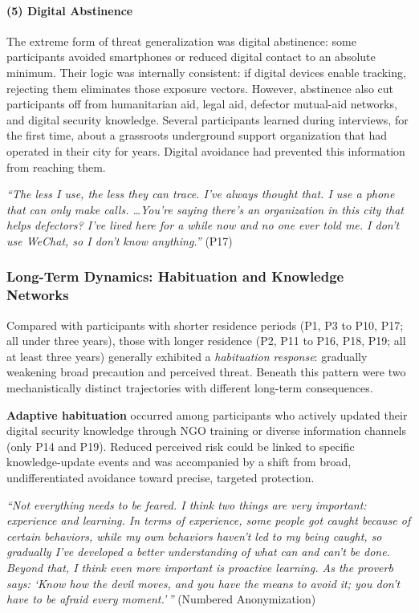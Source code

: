 \documentclass[conference,compsoc]{IEEEtran}
\begin{document}
\paragraph{\textbf{(5) Digital Abstinence}}
The extreme form of threat generalization was digital abstinence: some participants avoided smartphones or reduced digital contact to an absolute minimum. Their logic was internally consistent: if digital devices enable tracking, rejecting them eliminates those exposure vectors. However, abstinence also cut participants off from humanitarian aid, legal aid, defector mutual-aid networks, and digital security knowledge. Several participants learned during interviews, for the first time, about a grassroots underground support organization that had operated in their city for years. Digital avoidance had prevented this information from reaching them.

\begin{displayquote}
\textit{``The less I use, the less they can trace. I've always thought that. I use a phone that can only make calls. \ldots You're saying there's an organization in this city that helps defectors? I've lived here for a while now and no one ever told me. I don't use WeChat, so I don't know anything.''} (P17)
\end{displayquote}

\subsubsection{Long-Term Dynamics: Habituation and Knowledge Networks}
\label{subsubsec:longitudinal}

Compared with participants with shorter residence periods (P1, P3 to P10, P17; all under three years), those with longer residence (P2, P11 to P16, P18, P19; all at least three years) generally exhibited a \emph{habituation response}: gradually weakening broad precaution and perceived threat. Beneath this pattern were two mechanistically distinct trajectories with different long-term consequences.

\textbf{Adaptive habituation} occurred among participants who actively updated their digital security knowledge through NGO training or diverse information channels (only P14 and P19). Reduced perceived risk could be linked to specific knowledge-update events and was accompanied by a shift from broad, undifferentiated avoidance toward precise, targeted protection.

\begin{displayquote}
\textit{``Not everything needs to be feared. I think two things are very important: experience and learning. In terms of experience, some people got caught because of certain behaviors, while my own behaviors haven't led to my being caught, so gradually I've developed a better understanding of what can and can't be done. Beyond that, I think even more important is proactive learning. As the proverb says: `Know how the devil moves, and you have the means to avoid it; you don't have to be afraid every moment.'\,''} (Numbered Anonymization)
\end{displayquote}
\end{document}
